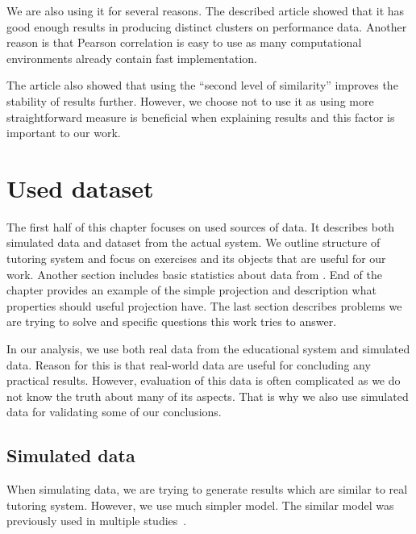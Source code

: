 \documentclass[
  printed, %
  table,   %
  nolof,     %
  nolot,     %
  color,
  final,
  nocover
]{fithesis3}
\begin{document}
We are also using it for several reasons. The described article showed that it has good enough results in producing distinct clusters on performance data. Another reason is that Pearson correlation is easy to use as many computational environments already contain fast implementation.

The article also showed that using the ``second level of similarity'' improves the stability of results further. However, we choose not to use it as using more straightforward measure is beneficial when explaining results and this factor is important to our work.


\chapter{Used dataset}\label{used-dataset}

The first half of this chapter focuses on used sources of data. It describes both simulated data and dataset from the actual system. We outline structure of tutoring system and focus on exercises and its objects that are useful for our work. Another section includes basic statistics about data from \umimeCesky{}. End of the chapter provides an example of the simple projection and description what properties should useful projection have. The last section describes problems we are trying to solve and specific questions this work tries to answer.


In our analysis, we use both real data from the educational system and simulated data. Reason for this is that real-world data are useful for concluding any practical results. However, evaluation of this data is often complicated as we do not know the truth about many of its aspects. That is why we also use simulated data for validating some of our conclusions.


\section{Simulated data}\label{simulated-data}

When simulating data, we are trying to generate results which are similar to real tutoring system. However, we use much simpler model. The similar model was previously used in multiple studies~\cite{piech2015deep, pelanek2017measuring}.
\end{document}
